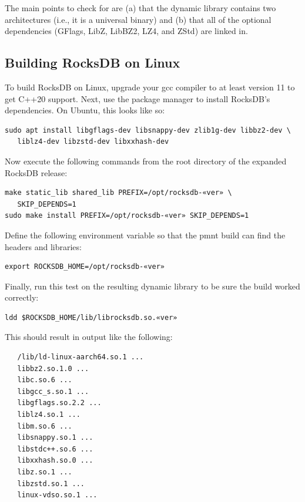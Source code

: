 The main points to check for are (a) that the dynamic library contains two architectures (i.e., it is a universal binary) and (b) that all of the optional dependencies (GFlags, LibZ, LibBZ2, LZ4, and ZStd) are linked in.


\subsection{Building RocksDB on Linux}
\label{sec:BuildingRocksDBOnLinux}

To build RocksDB on Linux, upgrade your gcc compiler to at least version 11 to get C++20 support. Next, use the package manager to install RocksDB's dependencies. On Ubuntu, this looks like so:
{\small\begin{verbatim}
sudo apt install libgflags-dev libsnappy-dev zlib1g-dev libbz2-dev \
   liblz4-dev libzstd-dev libxxhash-dev
\end{verbatim}}

Now execute the following commands from the root directory of the expanded RocksDB release:

{\small\begin{verbatim}
make static_lib shared_lib PREFIX=/opt/rocksdb-«ver» \
   SKIP_DEPENDS=1
sudo make install PREFIX=/opt/rocksdb-«ver» SKIP_DEPENDS=1
\end{verbatim}}

Define the following environment variable so that the \ac{pmnt} build can find the headers and libraries:
{\small\begin{verbatim}
export ROCKSDB_HOME=/opt/rocksdb-«ver»
\end{verbatim}}

Finally, run this test on the resulting dynamic library to be sure the build worked correctly:

{\small\begin{verbatim}
ldd $ROCKSDB_HOME/lib/librocksdb.so.«ver»
\end{verbatim}}

This should result in output like the following:

{\small\begin{verbatim}
   /lib/ld-linux-aarch64.so.1 ...
   libbz2.so.1.0 ...
   libc.so.6 ...
   libgcc_s.so.1 ...
   libgflags.so.2.2 ...
   liblz4.so.1 ...
   libm.so.6 ...
   libsnappy.so.1 ...
   libstdc++.so.6 ...
   libxxhash.so.0 ...
   libz.so.1 ...
   libzstd.so.1 ...
   linux-vdso.so.1 ...
\end{verbatim}}

